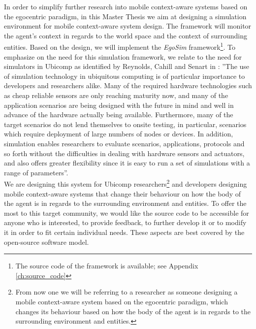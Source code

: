 In order to simplify further research into mobile context-aware systems based on the egocentric paradigm, in this Master Thesis we aim at designing a simulation environment for mobile context-aware system design. The framework will monitor the agent's context in regards to the world space and the context of surrounding entities. Based on the design, we will implement the \emph{EgoSim} framework\footnote{The source code of the framework is available; see Appendix \ref{ch:source_code}}. To emphasize on the need for this simulation framework, we relate to the need for simulators in Ubicomp as identified by Reynolds, Cahill and Senart in \cite{reynolds2006requirements}: ''The use of simulation technology in ubiquitous computing is of particular importance to developers and researchers alike. Many of the required hardware technologies such as cheap reliable sensors are only reaching maturity now, and many of the application scenarios are being designed with the future in mind and well in advance of the hardware actually being available. Furthermore, many of the target scenarios do not lend themselves to onsite testing, in particular, scenarios which require deployment of large numbers of nodes or devices. In addition, simulation enables researchers to evaluate scenarios, applications, protocols and so forth without the difficulties in dealing with hardware sensors and actuators, and also offers greater flexibility since it is easy to run a set of simulations with a range of parameters''.\\

We are designing this system for Ubicomp researchers\footnote{From now one we will be referring to a researcher as someone designing a mobile context-aware system based on the egocentric paradigm, which changes its behaviour based on how the body of the agent is in regards to the surrounding environment and entities.} and developers designing mobile context-aware systems that change their behaviour on how the body of the agent is in regards to the surrounding environment and entities. To offer the most to this target community, we would like the source code to be accessible for anyone who is interested, to provide feedback, to further develop it or to modify it in order to fit certain individual needs. These aspects are best covered by the open-source software model.\\









